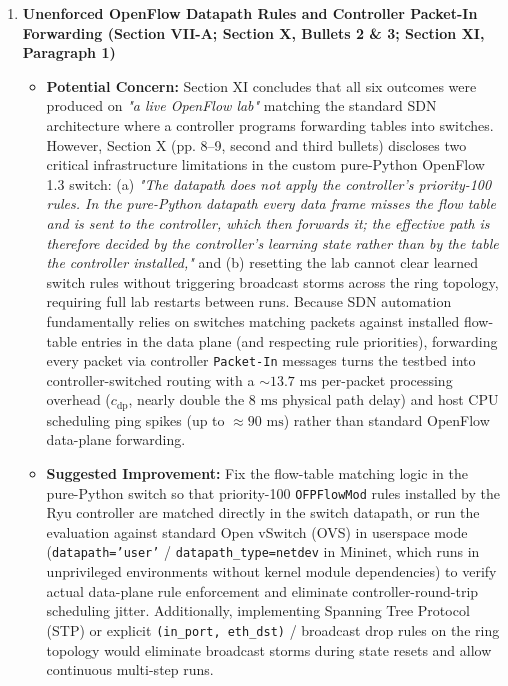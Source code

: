 \documentclass[11pt,a4paper]{article}
\begin{document}
\begin{enumerate}[leftmargin=1.6em,itemsep=3pt]
\item \textbf{Unenforced OpenFlow Datapath Rules and Controller Packet-In Forwarding (Section VII-A; Section X, Bullets 2 \& 3; Section XI, Paragraph 1)}
\begin{itemize}[leftmargin=1.8em,itemsep=2pt]
\item \textbf{Potential Concern:} Section XI concludes that all six outcomes were produced on \emph{"a live OpenFlow lab"} matching the standard SDN architecture where a controller programs forwarding tables into switches. However, Section X (pp. 8–9, second and third bullets) discloses two critical infrastructure limitations in the custom pure-Python OpenFlow 1.3 switch: (a) \emph{"The datapath does not apply the controller's priority-100 rules. In the pure-Python datapath every data frame misses the flow table and is sent to the controller, which then forwards it; the effective path is therefore decided by the controller's learning state rather than by the table the controller installed,"} and (b) resetting the lab cannot clear learned switch rules without triggering broadcast storms across the ring topology, requiring full lab restarts between runs. Because SDN automation fundamentally relies on switches matching packets against installed flow-table entries in the data plane (and respecting rule priorities), forwarding every packet via controller \texttt{Packet-In} messages turns the testbed into controller-switched routing with a $\sim 13.7\text{ ms}$ per-packet processing overhead ($c_{\text{dp}}$, nearly double the $8\text{ ms}$ physical path delay) and host CPU scheduling ping spikes (up to $\approx 90\text{ ms}$) rather than standard OpenFlow data-plane forwarding.
\item \textbf{Suggested Improvement:} Fix the flow-table matching logic in the pure-Python switch so that priority-100 \texttt{OFPFlowMod} rules installed by the Ryu controller are matched directly in the switch datapath, or run the evaluation against standard Open vSwitch (OVS) in userspace mode (\texttt{datapath='user'} / \texttt{datapath\_type=netdev} in Mininet, which runs in unprivileged environments without kernel module dependencies) to verify actual data-plane rule enforcement and eliminate controller-round-trip scheduling jitter. Additionally, implementing Spanning Tree Protocol (STP) or explicit \texttt{(in\_port, eth\_dst)} / broadcast drop rules on the ring topology would eliminate broadcast storms during state resets and allow continuous multi-step runs.
\end{itemize}
\end{enumerate}
\end{document}
